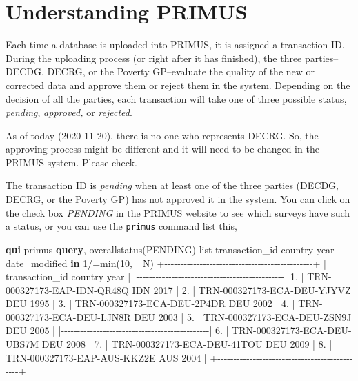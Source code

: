 \documentclass[
]{book}
\newenvironment{Shaded}{\begin{snugshade}}{\end{snugshade}}
\newcommand{\FunctionTok}[1]{\textcolor[rgb]{0.00,0.00,0.00}{#1}}
\newcommand{\KeywordTok}[1]{\textcolor[rgb]{0.13,0.29,0.53}{\textbf{#1}}}
\newcommand{\NormalTok}[1]{#1}
\newcommand{\OtherTok}[1]{\textcolor[rgb]{0.56,0.35,0.01}{#1}}
\begin{document}
\hypertarget{understand-primus}{%
\section{Understanding PRIMUS}\label{understand-primus}}

Each time a database is uploaded into PRIMUS, it is assigned a transaction ID.
During the uploading process (or right after it has finished), the three
parties--DECDG, DECRG, or the Poverty GP--evaluate the quality of the new or
corrected data and approve them or reject them in the system. Depending on the
decision of all the parties, each transaction will take one of three possible
status, \emph{pending}, \emph{approved,} or \emph{rejected}.

As of today (2020-11-20), there is no one who represents DECRG. So, the
approving process might be different and it will need to be changed in the
PRIMUS system. Please check.

The transaction ID is \emph{pending} when at least one of the three parties (DECDG,
DECRG, or the Poverty GP) has not approved it in the system. You can click on
the check box \emph{PENDING} in the PRIMUS website to see which surveys have such a
status, or you can use the \texttt{primus} command list this,

\begin{Shaded}
\begin{Highlighting}[]
\KeywordTok{qui}\NormalTok{ primus }\KeywordTok{query}\NormalTok{, overallstatus(PENDING)}
\OtherTok{list}\NormalTok{ transaction\_id country }\FunctionTok{year}\NormalTok{ date\_modified }\KeywordTok{in}\NormalTok{ 1/}\OtherTok{\textasciigrave{}=min(10, \_N)\textquotesingle{}}
\NormalTok{     +{-}{-}{-}{-}{-}{-}{-}{-}{-}{-}{-}{-}{-}{-}{-}{-}{-}{-}{-}{-}{-}{-}{-}{-}{-}{-}{-}{-}{-}{-}{-}{-}{-}{-}{-}{-}{-}{-}{-}{-}{-}{-}{-}{-}{-}{-}+}
\NormalTok{     |              transaction\_id   country   }\FunctionTok{year}\NormalTok{ |}
\NormalTok{     |{-}{-}{-}{-}{-}{-}{-}{-}{-}{-}{-}{-}{-}{-}{-}{-}{-}{-}{-}{-}{-}{-}{-}{-}{-}{-}{-}{-}{-}{-}{-}{-}{-}{-}{-}{-}{-}{-}{-}{-}{-}{-}{-}{-}{-}{-}|}
\NormalTok{  1. | TRN{-}000327173{-}EAP{-}IDN{-}QR48Q       IDN   2017 |}
\NormalTok{  2. | TRN{-}000327173{-}ECA{-}DEU{-}YJYVZ       DEU   1995 |}
\NormalTok{  3. | TRN{-}000327173{-}ECA{-}DEU{-}2P4DR       DEU   2002 |}
\NormalTok{  4. | TRN{-}000327173{-}ECA{-}DEU{-}LJN8R       DEU   2003 |}
\NormalTok{  5. | TRN{-}000327173{-}ECA{-}DEU{-}ZSN9J       DEU   2005 |}
\NormalTok{     |{-}{-}{-}{-}{-}{-}{-}{-}{-}{-}{-}{-}{-}{-}{-}{-}{-}{-}{-}{-}{-}{-}{-}{-}{-}{-}{-}{-}{-}{-}{-}{-}{-}{-}{-}{-}{-}{-}{-}{-}{-}{-}{-}{-}{-}{-}|}
\NormalTok{  6. | TRN{-}000327173{-}ECA{-}DEU{-}UBS7M       DEU   2008 |}
\NormalTok{  7. | TRN{-}000327173{-}ECA{-}DEU{-}41TOU       DEU   2009 |}
\NormalTok{  8. | TRN{-}000327173{-}EAP{-}AUS{-}KKZ2E       AUS   2004 |}
\NormalTok{     +{-}{-}{-}{-}{-}{-}{-}{-}{-}{-}{-}{-}{-}{-}{-}{-}{-}{-}{-}{-}{-}{-}{-}{-}{-}{-}{-}{-}{-}{-}{-}{-}{-}{-}{-}{-}{-}{-}{-}{-}{-}{-}{-}{-}{-}{-}+}
\end{Highlighting}
\end{Shaded}
\end{document}
